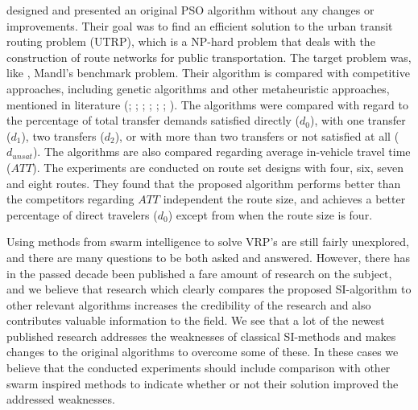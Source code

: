 \citet{kechagiopoulos14} designed and presented an original PSO algorithm without any changes or improvements. Their goal was to find an efficient solution to the urban transit routing problem (UTRP), which is a NP-hard problem that deals with the construction of route networks for public transportation. The target problem was, like \citet{nikolic14}, Mandl's benchmark problem. Their algorithm is compared with competitive approaches, including genetic algorithms and other metaheuristic approaches, mentioned in literature (\citet{baaj91}; \citet{chakroborty02}; \citet{kidwai98}; \citet{fan10}; \citet{fan09-2}; \citet{zhang10}; \citet{chew12}). The algorithms were compared with regard to the percentage of total transfer demands satisfied directly ($d_0$), with one transfer ($d_1$), two transfers ($d_2$), or with more than two transfers or not satisfied at all ($d_{unsat}$). The algorithms are also compared regarding average in-vehicle travel time ($ATT$). The experiments are conducted on route set designs with four, six, seven and eight routes. They found that the proposed algorithm performs better than the competitors regarding $ATT$ independent the route size, and achieves a better percentage of direct travelers ($d_0$) except from when the route size is four.  \newline

Using methods from swarm intelligence to solve VRP's are still fairly unexplored, and there are many questions to be both asked and answered. However, there has in the passed decade been published a fare amount of research on the subject, and we believe that research which clearly compares the proposed SI-algorithm to other relevant algorithms increases the credibility of the research and also contributes valuable information to the field. We see that a lot of the newest published research addresses the weaknesses of classical SI-methods and makes changes to the original algorithms to overcome some of these. In these cases we believe that the conducted experiments should include comparison with other swarm inspired methods to indicate whether or not their solution improved the addressed weaknesses. 

